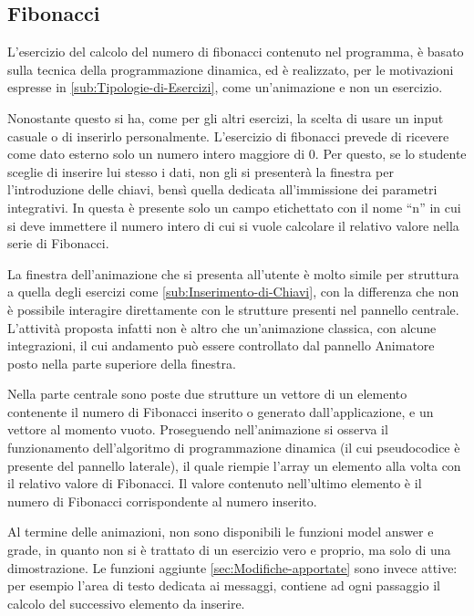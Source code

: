 \subsection{Fibonacci}

L'esercizio del calcolo del numero di fibonacci contenuto nel programma,
è basato sulla tecnica della programmazione dinamica, ed è realizzato,
per le motivazioni espresse in \ref{sub:Tipologie-di-Esercizi}, come
un'animazione e non un esercizio.

Nonostante questo si ha, come per gli altri esercizi, la scelta di
usare un input casuale o di inserirlo personalmente. L'esercizio di
fibonacci prevede di ricevere come dato esterno solo un numero intero
maggiore di 0. Per questo, se lo studente sceglie di inserire lui
stesso i dati, non gli si presenterà la finestra per l'introduzione
delle chiavi, bensì quella dedicata all'immissione dei parametri integrativi.
In questa è presente solo un campo etichettato con il nome {}``n''
in cui si deve immettere il numero intero di cui si vuole calcolare
il relativo valore nella serie di Fibonacci.

La finestra dell'animazione che si presenta all'utente è molto simile
per struttura a quella degli esercizi come \ref{sub:Inserimento-di-Chiavi},
con la differenza che non è possibile interagire direttamente con
le strutture presenti nel pannello centrale. L'attività proposta infatti
non è altro che un'animazione classica, con alcune integrazioni, il
cui andamento può essere controllato dal pannello Animatore posto
nella parte superiore della finestra.

Nella parte centrale sono poste due strutture un vettore di un elemento
contenente il numero di Fibonacci inserito o generato dall'applicazione,
e un vettore al momento vuoto. Proseguendo nell'animazione si osserva
il funzionamento dell'algoritmo di programmazione dinamica (il cui
pseudocodice è presente del pannello laterale), il quale riempie l'array
un elemento alla volta con il relativo valore di Fibonacci. Il valore
contenuto nell'ultimo elemento è il numero di Fibonacci corrispondente
al numero inserito.

Al termine delle animazioni, non sono disponibili le funzioni model
answer e grade, in quanto non si è trattato di un esercizio vero e
proprio, ma solo di una dimostrazione. Le funzioni aggiunte \ref{sec:Modifiche-apportate}
sono invece attive: per esempio l'area di testo dedicata ai messaggi,
contiene ad ogni passaggio il calcolo del successivo elemento da inserire.

